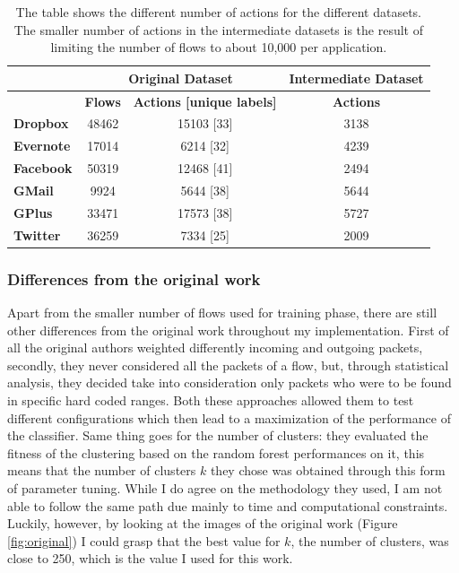 \begin{table}[!h]
\centering
\begin{tabular}{|l|c|c|c|}
\hline
      & \multicolumn{2}{c|}{Original Dataset} & Intermediate Dataset \\ \hline
         & \textbf{Flows}    & \textbf{Actions [unique labels]}    & \textbf{Actions}              \\ \hline
\textbf{Dropbox}  & 48462    & 15103 [33]                 & 3138                 \\ \hline
\textbf{Evernote} & 17014    & 6214 [32]                  & 4239                 \\ \hline
\textbf{Facebook} & 50319    & 12468 [41]                 & 2494                 \\ \hline
\textbf{GMail}    & 9924     & 5644 [38]                  & 5644                 \\ \hline
\textbf{GPlus}    & 33471    & 17573 [38]                 & 5727                 \\ \hline
\textbf{Twitter}  & 36259    & 7334 [25]                  & 2009                 \\ \hline
\end{tabular}
\caption{\small{The table shows the different number of actions for the different datasets. The smaller number of actions in the intermediate datasets is the result of limiting the number of flows to about 10,000 per application.}}
\label{tab:datasetdata}
\end{table}


\subsubsection{Differences from the original work}
Apart from the smaller number of flows used for training phase, there are still other differences from the original work throughout my implementation. First of all the original authors weighted differently incoming and outgoing packets, secondly, they never considered all the packets of a flow, but, through statistical analysis, they decided take into consideration only packets who were to be found in specific hard coded ranges. Both these approaches allowed them to test different configurations which then lead to a maximization of the performance of the classifier. Same thing goes for the number of clusters: they evaluated the fitness of the clustering based on the random forest performances on it, this means that the number of clusters $k$ they chose was obtained through this form of parameter tuning. While I do agree on the methodology they used, I am not able to follow the same path due mainly to time and computational constraints. Luckily, however, by looking at the images of the original work (Figure \ref{fig:original}) I could grasp that the best value for $k$, the number of clusters, was close to 250, which is the value I used for this work.  

